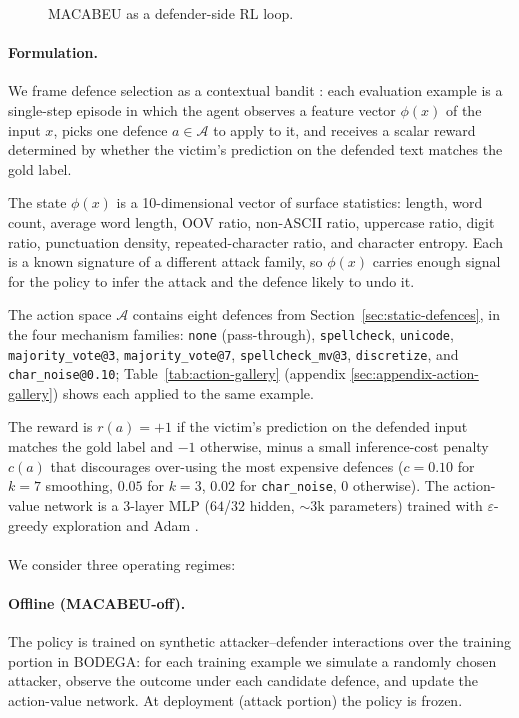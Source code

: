 \documentclass[11pt]{article}
\begin{document}
\begin{figure}[t]
  \centering
  \resizebox{\linewidth}{!}{}
  \caption{MACABEU as a defender-side RL loop.}
  \label{fig:macabeu-arch}
\end{figure}


\paragraph{Formulation.}
We frame defence selection as a contextual bandit \citep{LiContextualBandit2010, Langford2008}: each evaluation example is a single-step episode in which the agent observes a feature vector $\phi(x)$ of the input $x$, picks one defence $a\in\mathcal{A}$ to apply to it, and receives a scalar reward determined by whether the victim's prediction on the defended text matches the gold label.

The state $\phi(x)$ is a 10-dimensional vector of surface statistics: length, word count, average word length, OOV ratio, non-ASCII ratio, uppercase ratio, digit ratio, punctuation density, repeated-character ratio, and character entropy. Each is a known signature of a different attack family, so $\phi(x)$ carries enough signal for the policy to infer the attack and the defence likely to undo it.

The action space $\mathcal{A}$ contains eight defences from Section~\ref{sec:static-defences}, in the four mechanism families: \texttt{none} (pass-through), \texttt{spellcheck}, \texttt{unicode}, \texttt{majority\_vote@3}, \texttt{majority\_vote@7}, \texttt{spellcheck\_mv@3}, \texttt{discretize}, and \texttt{char\_noise@0.10}; Table~\ref{tab:action-gallery} (appendix \ref{sec:appendix-action-gallery}) shows each applied to the same example.


The reward is $r(a) = +1$ if the victim's prediction on the defended input matches the gold label and $-1$ otherwise, minus a small inference-cost penalty $c(a)$ that discourages over-using the most expensive defences ($c=0.10$ for $k{=}7$ smoothing, $0.05$ for $k{=}3$, $0.02$ for \texttt{char\_noise}, $0$ otherwise). The action-value network is a 3-layer MLP ($64$/$32$ hidden, ${\sim}3$k parameters) trained with $\varepsilon$-greedy exploration and Adam \citep{Kingma2015}.


\paragraph{}
We consider three operating regimes:
\paragraph{Offline (MACABEU-off).} The policy is trained on synthetic attacker--defender interactions over the training portion in BODEGA: for each training example we simulate a randomly chosen attacker, observe the outcome under each candidate defence, and update the action-value network. At deployment (attack portion) the policy is frozen.
\end{document}
